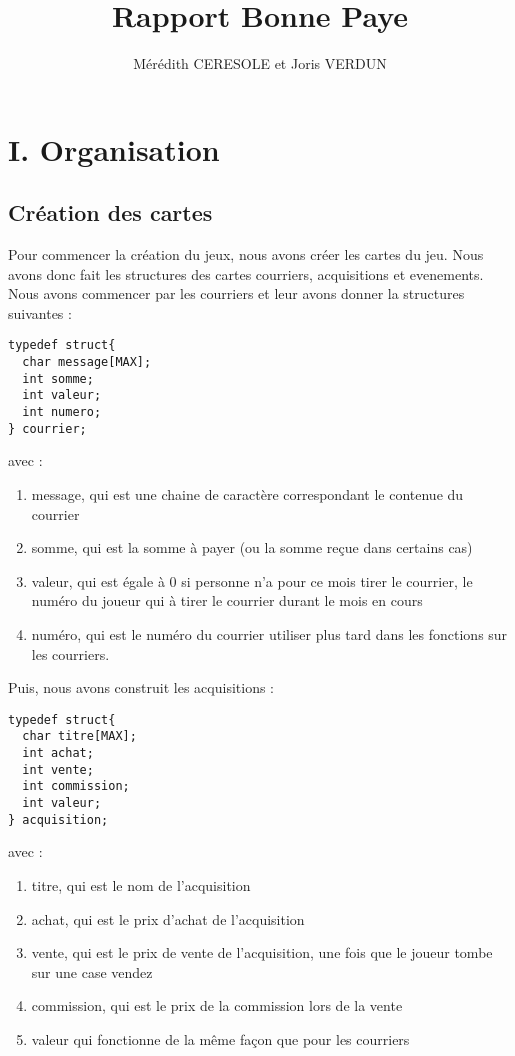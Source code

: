 \documentclass[a4paper, 11pt]{report}
\title{Rapport Bonne Paye}
\author{Mérédith CERESOLE et Joris VERDUN}
\begin{document}
\maketitle

\newpage

\section{I. Organisation}

\subsection{Création des cartes}
Pour commencer la création du jeux, nous avons créer les cartes du jeu. Nous avons donc fait les structures des cartes courriers, acquisitions et evenements.
Nous avons commencer par les courriers et leur avons donner la structures suivantes :

\begin{verbatim}
typedef struct{
  char message[MAX]; 
  int somme;
  int valeur;
  int numero;
} courrier;
\end{verbatim}

avec :
\begin{enumerate}
\item message, qui est une chaine de caractère correspondant le contenue du courrier
\item somme, qui est la somme à payer (ou la somme reçue dans certains cas)
\item valeur, qui est égale à 0 si personne n'a pour ce mois tirer le courrier, le numéro du joueur qui à tirer le courrier durant le mois en cours
\item numéro, qui est le numéro du courrier utiliser plus tard dans les fonctions sur les courriers.
\end{enumerate}

Puis, nous avons construit les acquisitions :

\begin{verbatim}
typedef struct{
  char titre[MAX];
  int achat;
  int vente;
  int commission;
  int valeur;
} acquisition;
\end{verbatim}

avec :
\begin{enumerate}
\item titre, qui est le nom de l'acquisition
\item achat, qui est le prix d'achat de l'acquisition
\item vente, qui est le prix de vente de l'acquisition, une fois que le joueur tombe sur une case vendez
\item commission, qui est le prix de la commission lors de la vente
\item valeur qui fonctionne de la même façon que pour les courriers
\end{enumerate}
\end{document}
